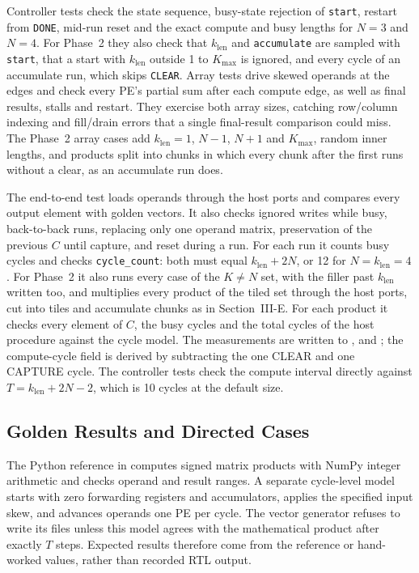 Controller tests check the state sequence, busy-state rejection of
\texttt{start}, restart from \texttt{DONE}, mid-run reset and the exact
compute and busy lengths for $N=3$ and $N=4$. For Phase~2 they also check
that $k_{\mathrm{len}}$ and \texttt{accumulate} are sampled with
\texttt{start}, that a start with $k_{\mathrm{len}}$ outside 1 to $K_{\max}$
is ignored, and every cycle of an accumulate run, which skips
\texttt{CLEAR}. Array tests drive skewed operands at the edges and check
every PE's partial sum after each compute edge, as well as final results,
stalls and restart. They exercise both array sizes, catching row/column
indexing and fill/drain errors that a single final-result comparison could
miss. The Phase~2 array cases add $k_{\mathrm{len}} = 1$, $N-1$, $N+1$ and
$K_{\max}$, random inner lengths, and products split into chunks in which
every chunk after the first runs without a clear, as an accumulate run
does.

The end-to-end test loads operands through the host ports and compares
every output element with golden vectors. It also checks ignored writes
while busy, back-to-back runs, replacing only one operand matrix,
preservation of the previous $C$ until capture, and reset during a run.
For each run it counts busy cycles and checks \texttt{cycle\_count}:
both must equal $k_{\mathrm{len}}+2N$, or 12 for $N=k_{\mathrm{len}}=4$.
For Phase~2 it also runs every case of the $K \neq N$ set, with the filler
past $k_{\mathrm{len}}$ written too, and multiplies every product of the
tiled set through the host ports, cut into tiles and accumulate chunks as in
Section~III-E. For each product it checks every element of $C$, the busy
cycles and the total cycles of the host procedure against the cycle model.
The measurements are written to ,
 and
; the compute-cycle field is derived
by subtracting the one CLEAR and one CAPTURE cycle. The controller tests
check the compute interval directly against $T=k_{\mathrm{len}}+2N-2$,
which is 10 cycles at the default size.

\subsection{Golden Results and Directed Cases}
The Python reference in  computes signed
matrix products with NumPy integer arithmetic and checks operand and
result ranges. A separate cycle-level model starts with zero forwarding
registers and accumulators, applies the specified input skew, and advances
operands one PE per cycle. The vector generator refuses to write its
files unless this model agrees with the mathematical product after
exactly $T$ steps. Expected results therefore come from the reference or
hand-worked values, rather than recorded RTL output.

